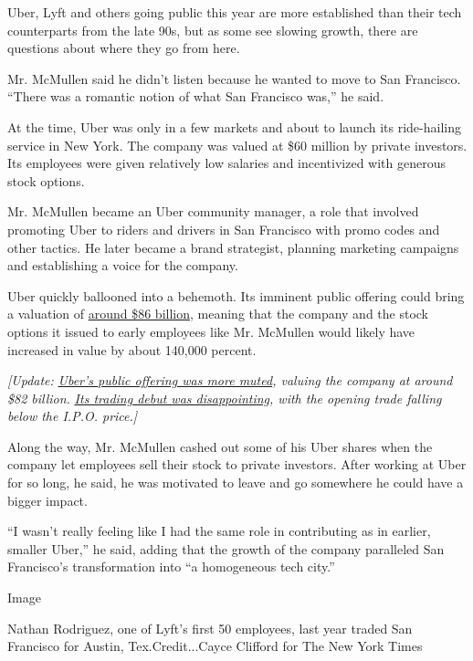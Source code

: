 Uber, Lyft and others going public this year are more established than
their tech counterparts from the late 90s, but as some see slowing
growth, there are questions about where they go from here.

Mr. McMullen said he didn't listen because he wanted to move to San
Francisco. ``There was a romantic notion of what San Francisco was,'' he
said.

At the time, Uber was only in a few markets and about to launch its
ride-hailing service in New York. The company was valued at \$60 million
by private investors. Its employees were given relatively low salaries
and incentivized with generous stock options.

Mr. McMullen became an Uber community manager, a role that involved
promoting Uber to riders and drivers in San Francisco with promo codes
and other tactics. He later became a brand strategist, planning
marketing campaigns and establishing a voice for the company.

Uber quickly ballooned into a behemoth. Its imminent public offering
could bring a valuation of
\href{https://www.nytimes.com/2019/05/08/technology/uber-ipo-price.html}{around
\$86 billion}, meaning that the company and the stock options it issued
to early employees like Mr. McMullen would likely have increased in
value by about 140,000 percent.

\emph{{[}Update:}
\href{https://www.nytimes.com/2019/05/09/technology/uber-ipo-price.html}{\emph{Uber's
public offering was more muted}}\emph{, valuing the company at around
\$82 billion. \textbar{}}
\href{https://www.nytimes.com/2019/05/10/technology/uber-stock-price-ipo.html}{\emph{Its
trading debut was disappointing}}\emph{, with the opening trade falling
below the I.P.O. price.{]}}

Along the way, Mr. McMullen cashed out some of his Uber shares when the
company let employees sell their stock to private investors. After
working at Uber for so long, he said, he was motivated to leave and go
somewhere he could have a bigger impact.

``I wasn't really feeling like I had the same role in contributing as in
earlier, smaller Uber,'' he said, adding that the growth of the company
paralleled San Francisco's transformation into ``a homogeneous tech
city.''

Image

Nathan Rodriguez, one of Lyft's first 50 employees, last year traded San
Francisco for Austin, Tex.Credit...Cayce Clifford for The New York Times

